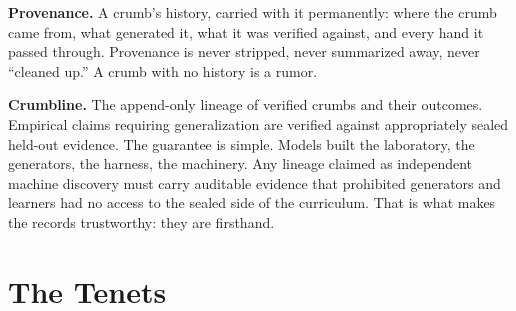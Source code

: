 \documentclass[11pt]{article}
\begin{document}
\textbf{Provenance.} A crumb's history, carried with it permanently: where the crumb came from, what generated it, what it was verified against, and every hand it passed through. Provenance is never stripped, never summarized away, never ``cleaned up.'' A crumb with no history is a rumor.

\textbf{Crumbline.} The append-only lineage of verified crumbs and their outcomes. Empirical claims requiring generalization are verified against appropriately sealed held-out evidence. The guarantee is simple. Models built the laboratory, the generators, the harness, the machinery. Any lineage claimed as independent machine discovery must carry auditable evidence that prohibited generators and learners had no access to the sealed side of the curriculum. That is what makes the records trustworthy: they are firsthand.

\section{The Tenets}
\end{document}
